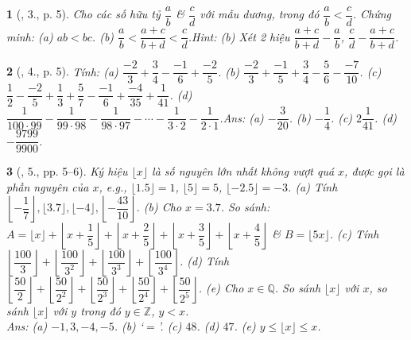 \documentclass{article}
\newtheorem{baitoan}{}
\begin{document}
\begin{baitoan}[\cite{Binh_Toan_7_tap_1}, 3., p. 5]
	Cho các số hữu tỷ $\dfrac{a}{b}$ \& $\dfrac{c}{d}$ với mẫu dương, trong đó $\dfrac{a}{b} < \dfrac{c}{d}$. Chứng minh: (a) $ab < bc$. (b) $\dfrac{a}{b} < \dfrac{a + c}{b + d} < \dfrac{c}{d}$.\hfill{\sf Hint: (b) Xét 2 hiệu $\dfrac{a + c}{b + d} - \dfrac{a}{b}$, $\dfrac{c}{d} - \dfrac{a + c}{b + d}$.}
\end{baitoan}

\begin{baitoan}[\cite{Binh_Toan_7_tap_1}, 4., p. 5]
	Tính: (a) $\dfrac{-2}{3} + \dfrac{3}{4} - \dfrac{-1}{6} + \dfrac{-2}{5}$. (b) $\dfrac{-2}{3} + \dfrac{-1}{5} + \dfrac{3}{4} - \dfrac{5}{6} - \dfrac{-7}{10}$. (c) $\dfrac{1}{2} - \dfrac{-2}{5} + \dfrac{1}{3} + \dfrac{5}{7} - \dfrac{-1}{6} + \dfrac{-4}{35} + \dfrac{1}{41}$. (d) $\dfrac{1}{100\cdot 99} - \dfrac{1}{99\cdot 98} - \dfrac{1}{98\cdot 97} - \cdots - \dfrac{1}{3\cdot 2} - \dfrac{1}{2\cdot 1}$.\hfill{\sf Ans: (a) $-\dfrac{3}{20}$. (b) $-\dfrac{1}{4}$. (c) $2\dfrac{1}{41}$. (d) $-\dfrac{9799}{9900}$.}
\end{baitoan}

\begin{baitoan}[\cite{Binh_Toan_7_tap_1}, 5., pp. 5--6]
	Ký hiệu $\lfloor x\rfloor$ là số nguyên lớn nhất không vượt quá $x$, được gọi là \emph{phần nguyên} của $x$, e.g., $\lfloor 1.5\rfloor = 1$, $\lfloor 5\rfloor = 5$, $\lfloor -2.5\rfloor = -3$. (a) Tính $\left\lfloor-\dfrac{1}{7}\right\rfloor,\lfloor 3.7\rfloor,\lfloor-4\rfloor,\left\lfloor-\dfrac{43}{10}\right\rfloor$. (b) Cho $x = 3.7$. So sánh: $A = \lfloor x\rfloor + \left\lfloor x + \dfrac{1}{5}\right\rfloor + \left\lfloor x + \dfrac{2}{5}\right\rfloor + \left\lfloor x + \dfrac{3}{5}\right\rfloor + \left\lfloor x + \dfrac{4}{5}\right\rfloor$ \& $B = \lfloor 5x\rfloor$. (c) Tính $ \left\lfloor\dfrac{100}{3}\right\rfloor + \left\lfloor\dfrac{100}{3^2}\right\rfloor + \left\lfloor\dfrac{100}{3^3}\right\rfloor + \left\lfloor\dfrac{100}{3^4}\right\rfloor$. (d) Tính $\left\lfloor\dfrac{50}{2}\right\rfloor + \left\lfloor\dfrac{50}{2^2}\right\rfloor + \left\lfloor\dfrac{50}{2^3}\right\rfloor + \left\lfloor\dfrac{50}{2^4}\right\rfloor + \left\lfloor\dfrac{50}{2^5}\right\rfloor$.  (e) Cho $x\in\mathbb{Q}$. So sánh $\lfloor x\rfloor$ với $x$, so sánh $\lfloor x\rfloor$ với $y$ trong đó $y\in\mathbb{Z}$, $y < x$.\\\mbox{}\hfill{\sf Ans: (a) $-1,3,-4,-5$. (b) `$=$'. (c) $48$. (d) $47$. (e) $y\le\lfloor x\rfloor\le x$.}
\end{baitoan}
\end{document}
